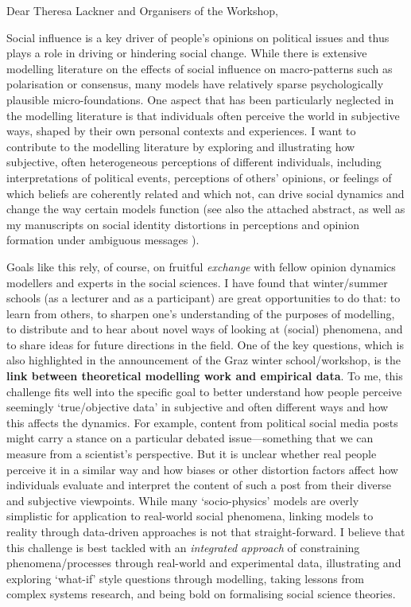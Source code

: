 Dear Theresa Lackner and Organisers of the Workshop, 

Social influence is a key driver of people's opinions on political issues and thus plays a role in driving or hindering social change. While there is extensive modelling literature on the effects of social influence on macro-patterns such as polarisation or consensus, many models have relatively sparse psychologically plausible micro-foundations. One aspect that has been particularly neglected in the modelling literature is that individuals often perceive the world in subjective ways, shaped by their own personal contexts and experiences. I want to contribute to the modelling literature by exploring and illustrating how subjective, often heterogeneous perceptions of different individuals, including interpretations of political events, perceptions of others' opinions, or feelings of which beliefs are coherently related and which not, can drive social dynamics and change the way certain models function (see also the attached abstract, as well as my manuscripts on social identity distortions in perceptions \cite{steiglechnerHowOpinionVariation2025c, steiglechnerSocialIdentityBias2023} and opinion formation under ambiguous messages \cite{steiglechnerNoiseOpinionDynamics2024, steiglechnerMakeNoiseWhy2025}).

Goals like this rely, of course, on fruitful \textit{exchange} with fellow opinion dynamics modellers and experts in the social sciences. I have found that winter/summer schools (as a lecturer and as a participant) are great opportunities to do that: to learn from others, to sharpen one's understanding of the purposes of modelling, to distribute and to hear about novel ways of looking at (social) phenomena, and to share ideas for future directions in the field. One of the key questions, which is also highlighted in the announcement of the Graz winter school/workshop, is the \textbf{link between theoretical modelling work and empirical data}. To me, this challenge fits well into the specific goal to better understand how people perceive seemingly `true/objective data' in subjective and often different ways and how this affects the dynamics. For example, content from political social media posts might carry a stance on a particular debated issue---something that we can measure from a scientist's perspective. But it is unclear whether real people perceive it in a similar way and how biases or other distortion factors affect how individuals evaluate and interpret the content of such a post from their diverse and subjective viewpoints. While many `socio-physics' models are overly simplistic for application to real-world social phenomena, linking models to reality through data-driven approaches is not that straight-forward. I believe that this challenge is best tackled with an \textit{integrated approach} of constraining phenomena/processes through real-world and experimental data, illustrating and exploring `what-if' style questions through modelling, taking lessons from complex systems research, and being bold on formalising social science theories.

